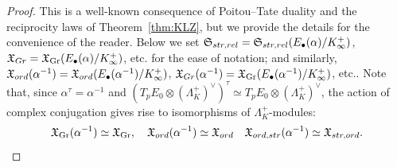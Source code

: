 \documentclass[a4paper,10pt]{amsart}
\numberwithin{equation}{section}
\numberwithin{equation}{section}
\theoremstyle{plain}
\theoremstyle{definition}
\theoremstyle{definition}
\theoremstyle{plain}
\theoremstyle{plain}
\theoremstyle{plain}
\theoremstyle{plain}
\newcommand{\X}{\mathfrak{X}}
\DeclareMathOperator{\Gr}{Gr}
\begin{document}
\begin{proof}
This is a well-known consequence of Poitou--Tate duality and the reciprocity laws of Theorem~\ref{thm:KLZ}, but we provide the details for the convenience of the reader. Below we set $\mathfrak{S}_{\rm str,\rm rel}=\mathfrak{S}_{\rm str,\rm rel}(E_\bullet(\alpha)/K_\infty^+)$, $\X_{\rm Gr}=\X_{\Gr}(E_\bullet(\alpha)/K_\infty^+)$, etc. for the ease of notation; and similarly, $\X_{\rm ord}(\alpha^{-1})=\X_{\rm ord}(E_\bullet(\alpha^{-1})/K_\infty^+)$, $\X_{\rm Gr}(\alpha^{-1})=\X_{\Gr}(E_\bullet(\alpha^{-1})/K_\infty^+)$, etc.. Note that, since $\alpha^{\tau}=\alpha^{-1}$ and $(T_pE_{0}\otimes (\Lambda_K^+)^{\vee})^{\tau}\simeq T_pE_{0}\otimes (\Lambda_K^+)^{\vee}$, the action of complex conjugation gives rise to isomorphisms of $\Lambda_K^+$-modules:
\begin{equation}\label{eq:cc}
\X_{\Gr}(\alpha^{-1})\simeq \X_{\Gr}, \ \ \ \X_{\rm ord}(\alpha^{-1})\simeq \X_{\rm ord} \ \ \ \X_{\rm ord, str}(\alpha^{-1})\simeq \X_{\rm str, ord}.
\end{equation}


\end{proof}
\end{document}
